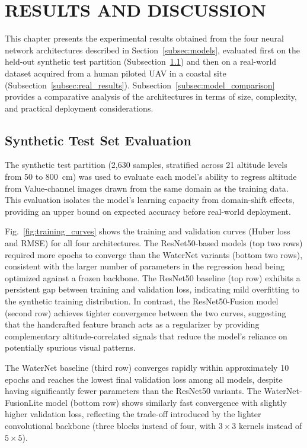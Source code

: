 \section{RESULTS AND DISCUSSION}

This chapter presents the experimental results obtained from the four neural network architectures described in Section~\ref{subsec:models}, evaluated first on the held-out synthetic test partition (Subsection~\ref{subsec:synth_results}) and then on a real-world dataset acquired from a human piloted UAV in a coastal site (Subsection~\ref{subsec:real_results}). Subsection~\ref{subsec:model_comparison} provides a comparative analysis of the architectures in terms of size, complexity, and practical deployment considerations.

\subsection{Synthetic Test Set Evaluation}
\label{subsec:synth_results}

The synthetic test partition (2{,}630 samples, stratified across 21 altitude levels from 50 to 800~cm) was used to evaluate each model's ability to regress altitude from Value-channel images drawn from the same domain as the training data. This evaluation isolates the model's learning capacity from domain-shift effects, providing an upper bound on expected accuracy before real-world deployment.

Fig.~\ref{fig:training_curves} shows the training and validation curves (Huber loss and RMSE) for all four architectures. The ResNet50-based models (top two rows) required more epochs to converge than the WaterNet variants (bottom two rows), consistent with the larger number of parameters in the regression head being optimized against a frozen backbone. The ResNet50 baseline (top row) exhibits a persistent gap between training and validation loss, indicating mild overfitting to the synthetic training distribution. In contrast, the ResNet50-Fusion model (second row) achieves tighter convergence between the two curves, suggesting that the handcrafted feature branch acts as a regularizer by providing complementary altitude-correlated signals that reduce the model's reliance on potentially spurious visual patterns.

The WaterNet baseline (third row) converges rapidly within approximately 10 epochs and reaches the lowest final validation loss among all models, despite having significantly fewer parameters than the ResNet50 variants. The WaterNet-FusionLite model (bottom row) shows similarly fast convergence with slightly higher validation loss, reflecting the trade-off introduced by the lighter convolutional backbone (three blocks instead of four, with $3\times3$ kernels instead of $5\times5$).

